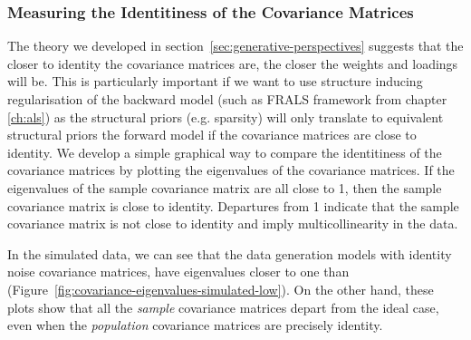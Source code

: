 
\subsubsection{Measuring the Identitiness of the Covariance Matrices}
The theory we developed in section~\ref{sec:generative-perspectives} suggests that the closer to identity the covariance matrices are, the closer the weights and \gls{loadings} will be.
This is particularly important if we want to use structure inducing regularisation of the backward model (such as FRALS framework from chapter \ref{ch:als}) as the structural priors (e.g. sparsity) will only translate to equivalent structural priors the forward model if the covariance matrices are close to identity.
We develop a simple graphical way to compare the identitiness of the covariance matrices by plotting the eigenvalues of the covariance matrices.
If the eigenvalues of the sample covariance matrix are all close to 1, then the sample covariance matrix is close to identity.
Departures from 1 indicate that the sample covariance matrix is not close to identity and imply multicollinearity in the data.

In the simulated data, we can see that the data generation models with identity noise covariance matrices, have eigenvalues closer to one than (Figure~\ref{fig:covariance-eigenvalues-simulated-low}).
On the other hand, these plots show that all the \textit{sample} covariance matrices depart from the ideal case, even when the \textit{population} covariance matrices are precisely identity.


